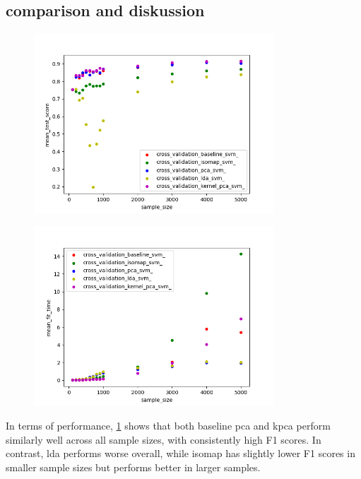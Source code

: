 \subsection*{comparison and diskussion}

\begin{figure}[htb!]
    \centering
    \includegraphics[width=0.8\textwidth]{figures/test_score_based_on_size.png}
    \caption{}
    \label{fig:experiment_4_performance_size}
\end{figure}


\begin{figure}[htb!]
    \centering
    \includegraphics[width=0.8\textwidth]{figures/time_based_on_size.png}
    \caption{}
    \label{fig:experiment_4_speed_size}
\end{figure}


In terms of performance, \ref*{fig:experiment_4_performance_size} shows that both baseline \gls{pca} and \gls{kpca} perform similarly well across all sample sizes, with consistently high F1 scores. In contrast, \gls{lda} performs worse overall, while \gls{isomap} has slightly lower F1 scores in smaller sample sizes but performs better in larger samples.

